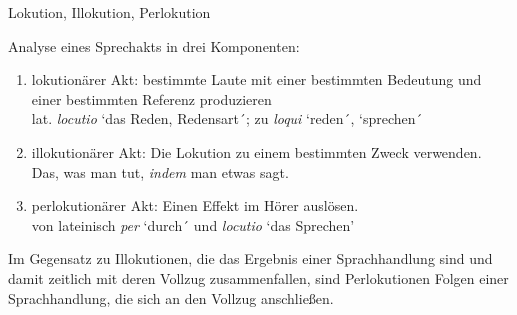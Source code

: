\begin{frame}{Lokution, Illokution, Perlokution}
  
Analyse eines Sprechakts in drei Komponenten:

\begin{enumerate}
\item \alert{lokutionärer Akt}: bestimmte Laute mit einer bestimmten Bedeutung und einer bestimmten
  Referenz produzieren\\
lat. \emph{locutio} `das Reden, Redensart´; zu \emph{loqui} `reden´, `sprechen´
\pause
\item \alert{illokutionärer Akt}: Die Lokution zu einem bestimmten Zweck verwenden.\\
 Das, was man tut, \emph{indem} man etwas sagt.\pause
\item \alert{perlokutionärer Akt}: Einen Effekt im Hörer auslösen.\\
von lateinisch \emph{per} `durch´ und \emph{locutio} `das Sprechen'
\end{enumerate}

Im Gegensatz zu Illokutionen, die das Ergebnis einer Sprachhandlung sind und damit zeitlich mit deren Vollzug zusammenfallen, sind Perlokutionen Folgen einer Sprachhandlung, die sich an den Vollzug anschließen.


\end{frame}





